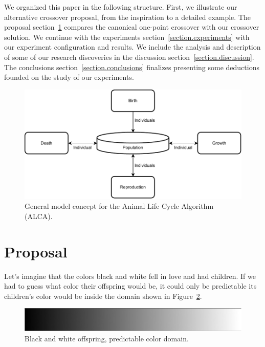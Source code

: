 \documentclass[graybox]{svmult}
\begin{document}
    We organized this paper in the following structure. First, we illustrate our alternative crossover proposal, from the inspiration to a detailed example. The proposal section~\ref{section.proposal} compares the canonical one-point crossover with our crossover solution. We continue with the experiments section~\ref{section.experiments} with our experiment configuration and results. We include the analysis and description of some of our research discoveries in the discussion section~\ref{section.discussion}. The conclusions section~\ref{section.conclusions} finalizes presenting some deductions founded on the study of our experiments.


    \begin{figure}[!ht]
        \centering
        \includegraphics[width=0.90\linewidth]{img/fig_algorithm_model.pdf}
        \caption{General model concept for the Animal Life Cycle Algorithm (ALCA)\cite{Felix-Saul2023}.} \label{fig.algorithm_model}
        \end{figure}


\section{Proposal}
    \label{section.proposal}

    Let's imagine that the colors black and white fell in love and had children. If we had to guess what color their offspring would be, it could only be predictable its children's color would be inside the domain shown in Figure~\ref{fig.grayscale_continuous}.

    \begin{figure}[!ht]
        \centering
        \includegraphics[width=0.80\linewidth]{img/fig_grayscale_continuous.pdf}
        \caption{Black and white offspring, predictable color domain.} \label{fig.grayscale_continuous}
        \end{figure}
\end{document}
